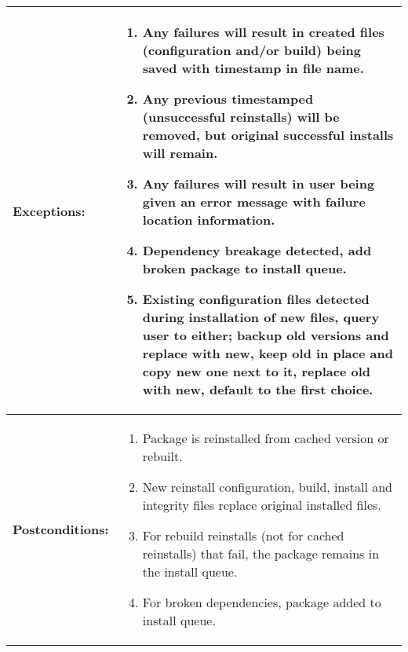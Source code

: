 \newpage
\begin{tabularx}{\linewidth}{|l|X|}
\hline
\textbf{Exceptions:} & 
\begin{minipage}{\linewidth} 
  \vspace{0.05em}
  \begin{enumerate}
    \item Any failures will result in created files (configuration and/or build) being saved with timestamp in file name.
    \item Any previous timestamped (unsuccessful reinstalls) will be removed, but original successful installs will remain.
    \item Any failures will result in user being given an error message with failure location information.
		\item Dependency breakage detected, add broken package to install queue.
    \item Existing configuration files detected during installation of new files, query user to either; backup old versions and replace with new, keep old in place and copy new one next to it, replace old with new, default to the first choice.
  \end{enumerate}
  \vspace{0.05em}
\end{minipage}
\\
\hline 
\textbf{Postconditions:} &
\begin{minipage}{\linewidth}
  \vspace{0.05em}
  \begin{enumerate}
    \item Package is reinstalled from cached version or rebuilt.
    \item New reinstall configuration, build, install and integrity files replace original installed files.
    \item For rebuild reinstalls (not for cached reinstalls) that fail, the package remains in the install queue.
		\item For broken dependencies, package added to install queue.
  \end{enumerate}
  \vspace{0.05em}
\end{minipage}
\\
\hline
\end{tabularx}


